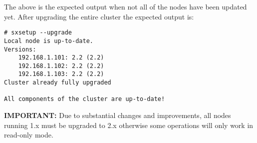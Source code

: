 The above is the expected output when not all of the nodes have been
updated yet. After upgrading the entire cluster the expected output is:
\begin{lstlisting}
# sxsetup --upgrade
Local node is up-to-date.
Versions:
	192.168.1.101: 2.2 (2.2)
	192.168.1.102: 2.2 (2.2)
	192.168.1.103: 2.2 (2.2)
Cluster already fully upgraded

All components of the cluster are up-to-date!
\end{lstlisting}
\textbf{IMPORTANT:} Due to substantial changes and improvements, all
nodes running \SX 1.x must be upgraded to 2.x otherwise some operations will
only work in read-only mode.
